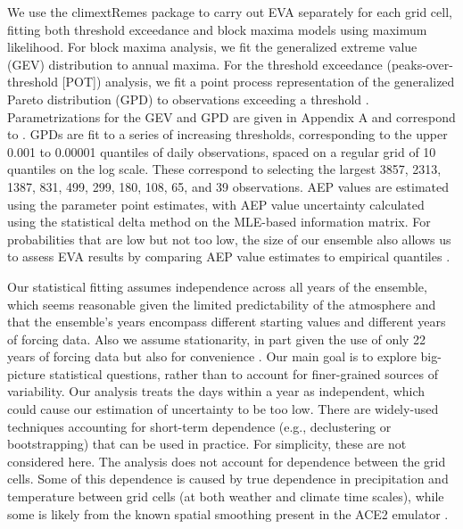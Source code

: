 \documentclass{ametsocV6.1}
\begin{document}
We use the climextRemes package \citep{climextRemes} to carry out EVA separately for each grid cell, fitting both threshold exceedance and block maxima models using maximum likelihood. 
For block maxima analysis, we fit the generalized extreme value (GEV) distribution to annual maxima.
For the threshold exceedance (peaks-over-threshold [POT]) analysis, we fit a point process representation of the generalized Pareto distribution (GPD) to observations exceeding a threshold \citep[Section 7]{smith1989extreme,coles2001introduction}.
Parametrizations for the GEV and GPD are given in Appendix A and correspond to \cite{coles2001introduction}.
GPDs are fit to a series of increasing thresholds, corresponding to the upper 0.001 to 0.00001 quantiles of daily observations, spaced on a regular grid of 10 quantiles on the log scale. 
These correspond to selecting the largest 3857, 2313, 1387, 831, 499, 299, 180, 108, 65, and 39 observations. 
AEP values are estimated using the parameter point estimates, with AEP value uncertainty calculated using the statistical delta method  on the MLE-based information matrix. 
For probabilities that are low but not too low, the size of our ensemble also allows us to assess EVA results by comparing AEP value estimates to empirical quantiles \citep[e.g.,][]{huang2016estimating}.


Our statistical fitting assumes independence across all years of the ensemble, which seems reasonable given the limited predictability of the atmosphere and that the ensemble's years encompass different starting values and different years of forcing data. 
Also we assume stationarity, in part given the use of only 22 years of forcing data but also for convenience \citep[see also][]{ben2020evaluation}. 
Our main goal is to explore big-picture statistical questions, rather than to account for finer-grained sources of variability. 
Our analysis treats the days within a year as independent, which could cause our estimation of uncertainty to be too low. 
There are widely-used techniques accounting for short-term dependence 
(e.g., declustering or bootstrapping) that can be used in practice. 
For simplicity, these are not considered here.
The analysis does not account for dependence between the grid cells. %
Some of this dependence is caused by true dependence in precipitation and temperature between grid cells (at both weather and climate time scales), while some is likely from the known spatial smoothing present in the ACE2 emulator \citep{watt2025ace2}.
\end{document}

